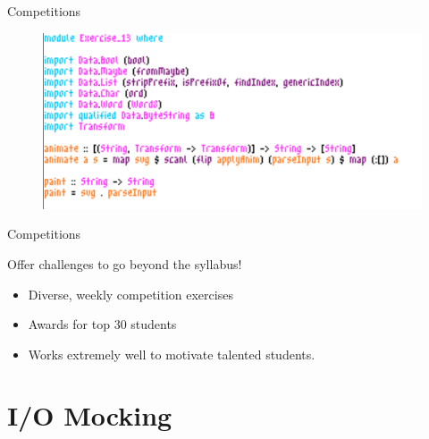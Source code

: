 \documentclass{beamer}
\begin{document}
\begin{frame}[fragile]{Competitions}
{\begin{figure}
\includegraphics[width=\linewidth]{assets/creativity2}
\end{figure}
}
\end{frame}

\begin{frame}[fragile]{Competitions}
\centerline{\Large{\alert{Offer challenges to go beyond the syllabus!}}}
\begin{itemize}
\item Diverse, weekly competition exercises
\item Awards for top 30 students
\item<2-> Works extremely well to motivate talented students.
\end{itemize}
\end{frame}


\section{I/O Mocking}
\end{document}
